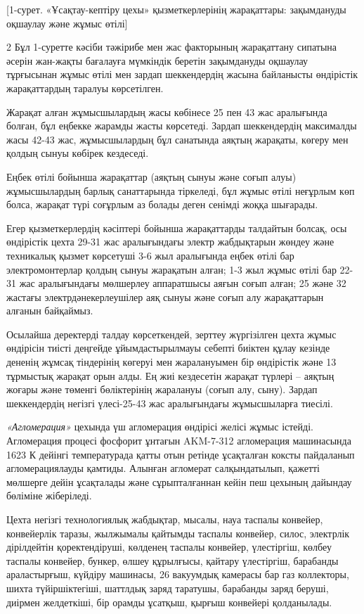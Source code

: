 [1-сурет. «Ұсақтау-кептіру цехы» қызметкерлерінің
жарақаттары: зақымдануды оқшаулау және жұмыс өтілі]

\begin{multicols}{2}
Бұл 1-суретте кәсіби тәжірибе мен жас факторының жарақаттану сипатына
әсерін жан-жақты бағалауға мүмкіндік беретін зақымдануды оқшаулау
тұрғысынан жұмыс өтілі мен зардап шеккендердің жасына байланысты
өндірістік жарақаттардың таралуы көрсетілген.

Жарақат алған жұмысшылардың жасы көбінесе 25 пен 43 жас аралығында
болған, бұл еңбекке жарамды жасты көрсетеді. Зардап шеккендердің
максималды жасы 42-43 жас, жұмысшылардың бұл санатында аяқтың жарақаты,
көгеру мен қолдың сынуы көбірек кездеседі.

Еңбек өтілі бойынша жарақаттар (аяқтың сынуы және соғып алуы)
жұмысшылардың барлық санаттарында тіркеледі, бұл жұмыс өтілі неғұрлым
көп болса, жарақат түрі соғұрлым аз болады деген сенімді жоққа шығарады.

Егер қызметкерлердің кәсіптері бойынша жарақаттарды талдайтын болсақ,
осы өндірістік цехта 29-31 жас аралығындағы электр жабдықтарын жөндеу
және техникалық қызмет көрсетуші 3-6 жыл аралығында еңбек өтілі бар
электромонтерлар қолдың сынуы жарақатын алған; 1-3 жыл жұмыс өтілі бар
22-31 жас аралығындағы мөлшерлеу аппаратшысы аяғын соғып алған; 25 және
32 жастағы электрдәнекерлеушілер аяқ сынуы және соғып алу жарақаттарын
алғанын байқаймыз.

Осылайша деректерді талдау көрсеткендей, зерттеу жүргізілген цехта жұмыс
өндірісін тиісті деңгейде ұйымдастырылмауы себепті биіктен құлау кезінде
дененің жұмсақ тіндерінің көгеруі мен жаралануымен бір өндірістік және
13 тұрмыстық жарақат орын алды. Ең жиі кездесетін жарақат түрлері --
аяқтың жоғары және төменгі бөліктерінің жаралануы (соғып алу, сыну).
Зардап шеккендердің негізгі үлесі-25-43 жас аралығындағы жұмысшыларға
тиесілі.

\emph{«Агломерация»} цехында үш агломерация өндірісі желісі жұмыс
істейді. Агломерация процесі фосфорит ұнтағын AKM-7-312 агломерация
машинасында 1623 К дейінгі температурада қатты отын ретінде ұсақталған
коксты пайдаланып агломерациялауды қамтиды. Алынған агломерат
салқындатылып, қажетті мөлшерге дейін ұсақталады және сұрыпталғаннан
кейін пеш цехының дайындау бөліміне жіберіледі.

Цехта негізгі технологиялық жабдықтар, мысалы, науа таспалы конвейер,
конвейерлік таразы, жылжымалы қайтымды таспалы конвейер, силос,
электрлік дірілдейтін қоректендіруші, көлденең таспалы конвейер,
үлестіргіш, көлбеу таспалы конвейер, бункер, өлшеу құрылғысы, қайтару
үлестіргіш, барабанды араластырғыш, күйдіру машинасы, 26 вакуумдық
камерасы бар газ коллекторы, шихта түйіршіктегіші, шаттлдық заряд
таратушы, барабанды заряд беруші, диірмен желдеткіші, бір орамды
ұсатқыш, қырғыш конвейері қолданылады.


\end{multicols}
